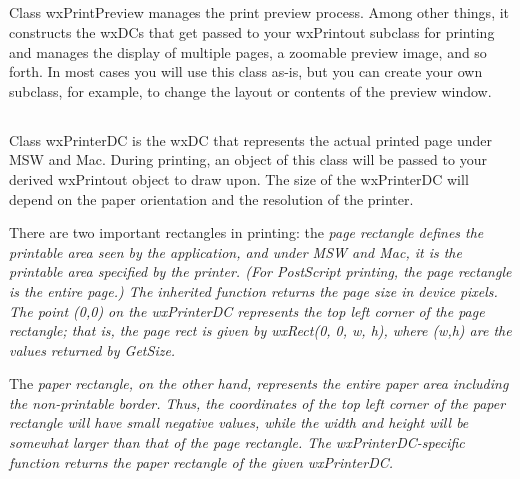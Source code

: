 \subsection{}

Class wxPrintPreview manages the print preview process. Among other things, it
constructs the wxDCs that get passed to your wxPrintout subclass for printing
and manages the display of multiple pages, a zoomable preview image, and so
forth. In most cases you will use this class as-is, but you can create your own
subclass, for example, to change the layout or contents of the preview window.


\subsection{}

Class wxPrinterDC is the wxDC that represents the actual printed page under MSW
and Mac. During printing, an object of this class will be passed to your derived
wxPrintout object to draw upon. The size of the wxPrinterDC will depend on the
paper orientation and the resolution of the printer.

There are two important rectangles in printing: the \em{page rectangle} defines
the printable area seen by the application, and under MSW and Mac, it is the
printable area specified by the printer. (For PostScript printing, the page
rectangle is the entire page.) The inherited function
 returns the page size in device pixels. The
point (0,0) on the wxPrinterDC represents the top left corner of the page
rectangle; that is, the page rect is given by wxRect(0, 0, w, h), where (w,h)
are the values returned by GetSize.

The \em{paper rectangle}, on the other hand, represents the entire paper area
including the non-printable border. Thus, the coordinates of the top left corner
of the paper rectangle will have small negative values, while the width and
height will be somewhat larger than that of the page rectangle. The
wxPrinterDC-specific function
 returns the paper
rectangle of the given wxPrinterDC.

\subsection{}

